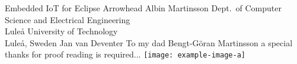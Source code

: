 \documentclass[12pt,a4paper,openright,final,twoside,ieeetran]{main}
\begin{document}
\def\thesistitle{Embedded IoT for Eclipse Arrowhead}
\def\theauthor{Albin Martinsson}
\def\theaddress{Dept.\ of Computer Science and Electrical Engineering\\
Lule{\aa} University of Technology\\ Lule{\aa}, Sweden}

\def\supervisors{Jan van Deventer}
\def\supervisorstring{Supervisor:} %
\def\dedication{To my dad Bengt-Göran Martinsson a special thanks for proof reading is required...}

\def\theabstract{}
\def\thepreface{}



\def\thelogo{\texttt{[image: example-image-a]} \\ \vspace{1cm}} %


\startpreamble
  {\thesistitle}
  {\theauthor}
  {\theaddress}
  {\supervisors}
  {\dedication}
  {\theabstract}
  {\thepreface}
  {\thelogo}

\end{document}
